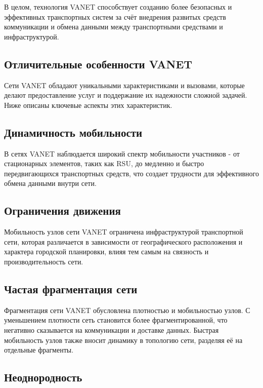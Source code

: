 В целом, технология VANET способствует созданию более безопасных и эффективных транспортных систем за счёт внедрения развитых средств коммуникации и обмена данными между транспортными средствами и инфраструктурой.

\newpage

\subsection*{Отличительные особенности VANET}

Сети VANET обладают уникальными характеристиками и вызовами, которые делают предоставление услуг и поддержание их надежности сложной задачей. Ниже описаны ключевые аспекты этих характеристик.

\subsection*{Динамичность мобильности}

В сетях VANET наблюдается широкий спектр мобильности участников - от стационарных элементов, таких как RSU, до медленно и быстро передвигающихся транспортных средств, что создает трудности для эффективного обмена данными внутри сети.

\subsection*{Ограничения движения}

Мобильность узлов сети VANET ограничена инфраструктурой транспортной сети, которая различается в зависимости от географического расположения и характера городской планировки, влияя тем самым на связность и производительность сети.

\subsection*{Частая фрагментация сети}

Фрагментация сети VANET обусловлена плотностью и мобильностью узлов. С уменьшением плотности сеть становится более фрагментированной, что негативно сказывается на коммуникации и доставке данных. Быстрая мобильность узлов также вносит динамику в топологию сети, разделяя её на отдельные фрагменты.

\subsection*{Неоднородность} 


